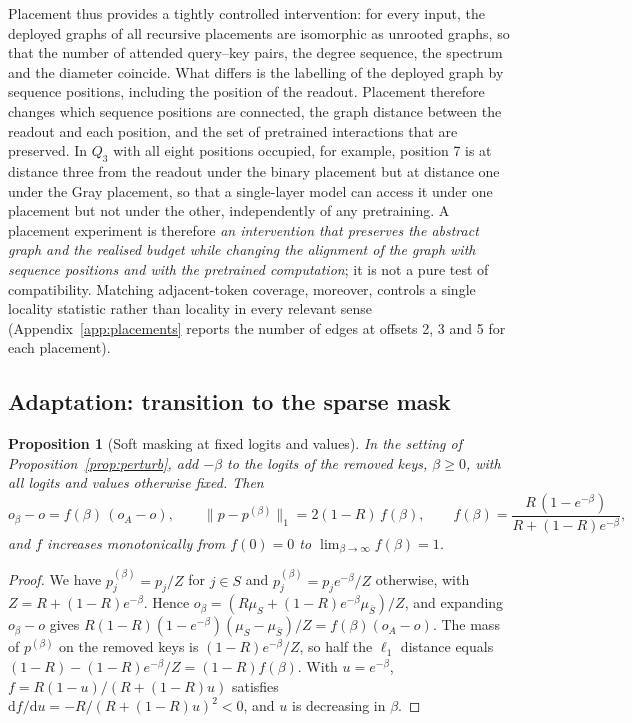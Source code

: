 \documentclass[10pt]{article}
\newtheorem{proposition}{Proposition}
\begin{document}
Placement thus provides a tightly controlled intervention: for every input, the deployed graphs of all recursive placements are isomorphic as unrooted graphs, so that the number of attended query--key pairs, the degree sequence, the spectrum and the diameter coincide. What differs is the labelling of the deployed graph by sequence positions, including the position of the readout. Placement therefore changes which sequence positions are connected, the graph distance between the readout and each position, and the set of pretrained interactions that are preserved. In $Q_3$ with all eight positions occupied, for example, position 7 is at distance three from the readout under the binary placement but at distance one under the Gray placement, so that a single-layer model can access it under one placement but not under the other, independently of any pretraining. A placement experiment is therefore \emph{an intervention that preserves the abstract graph and the realised budget while changing the alignment of the graph with sequence positions and with the pretrained computation}; it is not a pure test of compatibility. Matching adjacent-token coverage, moreover, controls a single locality statistic rather than locality in every relevant sense (Appendix~\ref{app:placements} reports the number of edges at offsets 2, 3 and 5 for each placement).

\subsection{Adaptation: transition to the sparse mask}
\label{sec:adapt}

\begin{proposition}[Soft masking at fixed logits and values]
\label{prop:soft}
In the setting of Proposition~\ref{prop:perturb}, add $-\beta$ to the logits of the removed keys, $\beta\ge0$, with all logits and values otherwise fixed. Then
\[
o_\beta-o=f(\beta)\,(o_A-o),\qquad \lVert p-p^{(\beta)}\rVert_1=2(1-R)\,f(\beta),\qquad f(\beta)=\frac{R\,(1-e^{-\beta})}{R+(1-R)e^{-\beta}},
\]
and $f$ increases monotonically from $f(0)=0$ to $\lim_{\beta\to\infty}f(\beta)=1$.
\end{proposition}
\begin{proof}
We have $p^{(\beta)}_j=p_j/Z$ for $j\in S$ and $p^{(\beta)}_j=p_je^{-\beta}/Z$ otherwise, with $Z=R+(1-R)e^{-\beta}$. Hence $o_\beta=(R\mu_S+(1-R)e^{-\beta}\mu_{\bar S})/Z$, and expanding $o_\beta-o$ gives $R(1-R)(1-e^{-\beta})(\mu_S-\mu_{\bar S})/Z=f(\beta)(o_A-o)$. The mass of $p^{(\beta)}$ on the removed keys is $(1-R)e^{-\beta}/Z$, so half the $\ell_1$ distance equals $(1-R)-(1-R)e^{-\beta}/Z=(1-R)f(\beta)$. With $u=e^{-\beta}$, $f=R(1-u)/(R+(1-R)u)$ satisfies $\mathrm{d}f/\mathrm{d}u=-R/(R+(1-R)u)^2<0$, and $u$ is decreasing in $\beta$.
\end{proof}
\end{document}
